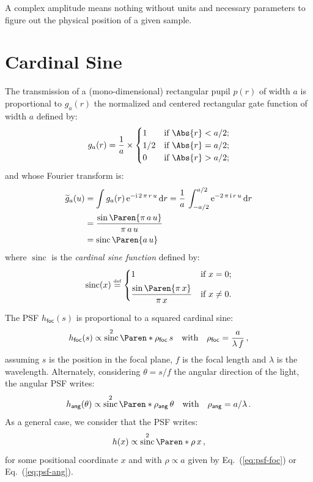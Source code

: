 \documentclass[a4paper,10pt,twocolumn]{scrartcl}
\newcommand*{\mathd}{\mathrm{d}}
\newcommand*{\mathe}{\mathrm{e}}
\newcommand*{\mathi}{\mathrm{i}}
\DeclareMathOperator{\sinc}{sinc}
\newcommand*{\Tag}[1]{\mathsf{#1}}
\newcommand*{\bydef}{\stackrel{{\scriptscriptstyle \text{def}}}{=}}
\newcommand*{\FT}[1]{\widetilde{#1}}
\begin{document}
A complex amplitude means nothing without units and necessary parameters to figure out the physical position of a given sample. 

\appendix
\section{Cardinal Sine}

The transmission of a (mono-dimensional) rectangular pupil $p(r)$ of width
$a$ is proportional to $g_{a}(r)$ the normalized and centered rectangular
gate function of width $a$ defined by:
\begin{equation}
   g_{a}(r) = \frac{1}{a} \times \begin{cases}
   1   & \text{if $\Abs{r} < a/2$;}\\
   1/2 & \text{if $\Abs{r} = a/2$;}\\
    0  & \text{if $\Abs{r} > a/2$;}\\
   \end{cases}
   \label{eq:gate-function}
\end{equation}
and whose Fourier transform is:
\begin{align}
  \FT{g}_a(u)
  &= \int g_a(r)\,\mathe^{-\mathi\,2\,\pi\,r\,u}\,\mathd r
  = \frac{1}{a} \, \int_{-a/2}^{a/2} \mathe^{-2\,\pi\,\mathi\,r\,u}\,\mathd r
  \notag\\
  &= \frac{\sin\Paren{\pi\,a\,u}}{\pi\,a\,u} \\
  &= \sinc\Paren{a\,u}
\end{align}
where $\sinc$ is the \emph{cardinal sine function} defined by:
\begin{equation}
   \sinc(x) \bydef \begin{cases}
   1   & \text{if $x = 0$;}\\[1ex]
   \displaystyle \frac{\sin\Paren{\pi\,x}}{\pi\,x}
   & \text{if $x \not= 0$.}
   \end{cases}
   \label{eq:sinc-function}
\end{equation}

The PSF $h_\Tag{foc}(s)$ is proportional to a squared cardinal sine:
\begin{equation}
  \label{eq:psf-foc}
  h_\Tag{foc}(s) \propto \sinc^2\Paren*{\rho_\Tag{foc}\,s}
  \quad\text{with}\quad
  \rho_\Tag{foc} = \frac{a}{\lambda\,f} \, ,
\end{equation}
assuming $s$ is the position in the focal plane, $f$ is the focal length
and $\lambda$ is the wavelength.  Alternately, considering $\theta = s/f$
the angular direction of the light, the angular PSF writes:
\begin{equation}
  \label{eq:psf-ang}
  h_\Tag{ang}(\theta) \propto \sinc^2\Paren*{\rho_\Tag{ang}\,\theta}
  \quad\text{with}\quad
  \rho_\Tag{ang} = a/\lambda \, .
\end{equation}
As a general case, we consider that the PSF writes:
\begin{equation}
  h(x) \propto \sinc^2\Paren*{\rho\,x} \, ,
  \label{eq:psf-general}
\end{equation}
for some positional coordinate $x$ and with $\rho \propto a$ given by
Eq.~(\ref{eq:psf-foc}) or Eq.~(\ref{eq:psf-ang}).
\end{document}

